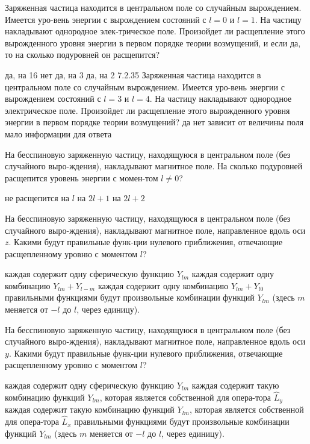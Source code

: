 \documentclass[11pt,a4paper]{exam}
\begin{document}
\begin{questions}
\question Заряженная частица находится в центральном поле со случайным вырождением. Имеется уро-вень энергии с вырождением состояний с $l = 0$ и $l = 1$. На частицу накладывают однородное элек-трическое поле. Произойдет ли расщепление этого вырожденного уровня энергии в первом порядке теории возмущений, и если да, то на сколько подуровней он расщепится?
\begin{choices}
\choice да, на 16      
\choice нет      
\choice да, на 3 
\choice да, на 2
7.2.35 Заряженная частица находится в центральном поле со случайным вырождением. Имеется уро-вень энергии с вырождением состояний с $l = 3$ и $l = 4$. На частицу накладывают однородное электрическое поле. Произойдет ли расщепление этого вырожденного уровня энергии в первом порядке теории возмущений?
\choice да
\choice нет
\choice зависит от величины поля
\choice мало информации для ответа
\end{choices}

\question На бесспиновую заряженную частицу, находящуюся в центральном поле (без случайного выро-ждения), накладывают магнитное поле. На сколько подуровней расщепится уровень энергии с момен-том $l \ne 0$?
\begin{choices}
\choice не расщепится  
\choice на $l$      
\choice на $2l + 1$ 
\choice на $2l + 2$
\end{choices}

\question На бесспиновую заряженную частицу, находящуюся в центральном поле (без случайного выро-ждения), накладывают магнитное поле, направленное вдоль оси $z$. Какими будут правильные функ-ции нулевого приближения, отвечающие расщепленному уровню с моментом $l$?
\begin{choices}
\choice каждая содержит одну сферическую функцию ${Y_{lm}}$
\choice каждая содержит одну комбинацию ${Y_{lm}} + {Y_{l - m}}$
\choice каждая содержит одну комбинацию ${Y_{lm}} + {Y_{l0}}$
\choice правильными функциями будут произвольные комбинации функций ${Y_{lm}}$ 
(здесь $m$ меняется от $ - l$ до $l$, через единицу).
\end{choices}

\question На бесспиновую заряженную частицу, находящуюся в центральном поле (без случайного выро-ждения), накладывают магнитное поле, направленное вдоль оси $y$. Какими будут правильные функ-ции нулевого приближения, отвечающие расщепленному уровню с моментом $l$?
\begin{choices}
\choice каждая содержит одну сферическую функцию ${Y_{lm}}$
\choice каждая содержит такую комбинацию функций ${Y_{lm}}$, которая является собственной для опера-тора ${\hat L_y}$
\choice каждая содержит такую комбинацию функций ${Y_{lm}}$, которая является собственной для опера-тора ${\hat L_x}$
\choice правильными функциями будут произвольные комбинации функций ${Y_{lm}}$ 
(здесь $m$ меняется от $ - l$ до $l$, через единицу).
\end{choices}


\end{questions}
\end{document}
